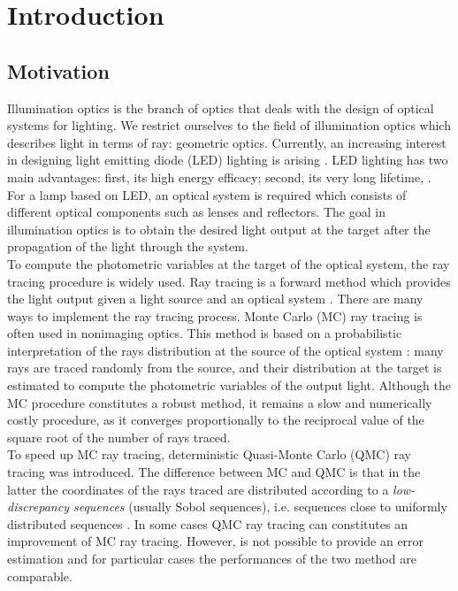 \chapter{Introduction}
\section{Motivation}
Illumination optics is the branch of optics that deals with the design of optical systems for lighting. We restrict ourselves to the field of illumination optics which describes light in terms of ray: geometric optics. 
Currently, an increasing interest in designing light emitting
diode (LED) lighting is arising \cite{moreno2008modeling}. LED lighting has two main
advantages: first, its high energy efficacy; second, its very long lifetime, \cite{taguchi2008present, haitz2011solid}. For a lamp based on LED, an optical system is required
which consists of different optical components such
as lenses and reflectors. The goal in illumination optics is to
obtain the desired light output at the target after the propagation
of the light through the system.
\\ \indent To compute the photometric variables at the target of the
optical system, the ray tracing procedure is widely used.
Ray tracing is a forward method which provides the light
output given a light source and an optical system \cite{Gross2005Handbook}. There are many ways to implement the ray tracing
process. Monte Carlo (MC) ray tracing is often used in nonimaging
optics. This method is based on a probabilistic interpretation
of the rays distribution at the source of the optical
system \cite{liu2010precise,Ting:1}: many rays are traced randomly from the source,
and their distribution at the target is estimated to compute the
photometric variables of the output light. Although the MC
procedure constitutes a robust method, it remains a slow and
numerically costly procedure, as it converges proportionally
to the reciprocal value of the square root of the number of rays
traced. \\ \indent To speed up MC ray tracing, deterministic Quasi-Monte Carlo (QMC) ray tracing was introduced. The difference between MC and QMC is that in the latter the coordinates of the rays traced are distributed according to a \textit{low-discrepancy sequences} (usually Sobol sequences), i.e. sequences close to uniformly distributed sequences \cite{levy2002introduction}. 
In some cases QMC ray tracing can constitutes an improvement of MC ray tracing. However, is not possible to provide an error estimation and for particular cases the performances of the two method are comparable. 
